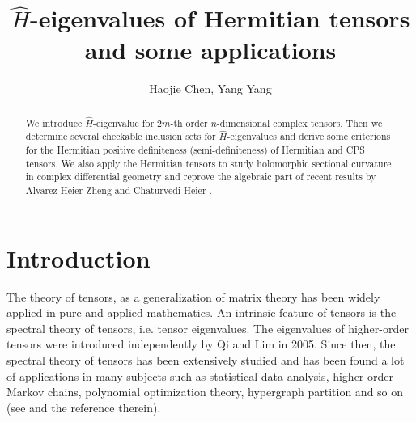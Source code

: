 \documentclass[10pt,reqno]{amsart}
\theoremstyle{definition}
\begin{document}
\title{$\hat{H}$-eigenvalues of Hermitian tensors and some applications}
\author{Haojie Chen, Yang Yang}
\address{Department of Mathematics, Zhejiang Normal University, Jinhua Zhejiang, 321004, China}
\date{}
\maketitle

\begin{abstract}
We introduce $\hat{H}$-eigenvalue for $2m$-th order $n$-dimensional complex tensors. Then we determine several checkable inclusion sets for $\hat{H}$-eigenvalues and derive some criterions for the Hermitian positive definiteness (semi-definiteness) of Hermitian and CPS tensors. We also apply the Hermitian tensors to study holomorphic sectional curvature in complex differential geometry and reprove the algebraic part of recent results by Alvarez-Heier-Zheng \cite{AHZ} and Chaturvedi-Heier \cite{CH}.
\end{abstract}

\tableofcontents
\section{Introduction}

The theory of tensors, as a generalization of matrix theory has been widely applied in pure and applied mathematics. An intrinsic feature of tensors is the spectral theory of tensors, i.e. tensor eigenvalues. The eigenvalues of higher-order tensors were introduced independently by Qi \cite{Q1} and Lim \cite{Lim} in 2005. Since then, the spectral theory of tensors has been extensively studied and has been found a lot of applications in many subjects such as statistical data analysis, higher order Markov chains, polynomial optimization theory, hypergraph partition and so on (see \cite{QL} and the reference therein). 
\end{document}
